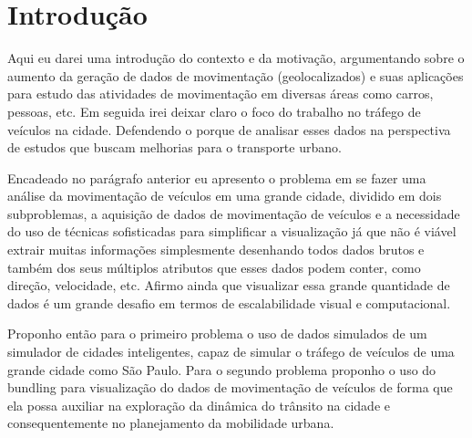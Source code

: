\chapter{Introdução}
\label{cap:introducao}

Aqui eu darei uma introdução do contexto e da motivação, argumentando sobre o aumento da geração de dados de
movimentação (geolocalizados) e suas aplicações para estudo das atividades de movimentação
em diversas áreas como carros, pessoas, etc. Em seguida irei deixar claro o foco do trabalho no tráfego de veículos
na cidade. Defendendo o porque de analisar esses dados na
perspectiva de estudos que buscam melhorias para o transporte urbano.

Encadeado no parágrafo anterior eu apresento o problema em se fazer uma análise
da movimentação de veículos em uma grande cidade, dividido em dois
subproblemas, a aquisição de dados de movimentação de veículos e a necessidade
do uso de técnicas sofisticadas para simplificar a visualização já que não é
viável extrair muitas informações simplesmente desenhando todos dados brutos e
também dos seus múltiplos atributos que esses dados podem conter, como direção,
velocidade, etc.  Afirmo ainda que visualizar essa grande quantidade de dados é
um grande desafio em termos de escalabilidade visual e computacional.

Proponho então para o primeiro problema o uso de dados simulados de um
simulador de cidades inteligentes, capaz de simular o tráfego de veículos de
uma grande cidade como São Paulo. Para o segundo problema proponho o uso do
bundling para visualização do dados de movimentação de veículos de
forma que ela possa auxiliar na exploração da dinâmica do trânsito na cidade e
consequentemente no planejamento da mobilidade urbana.

